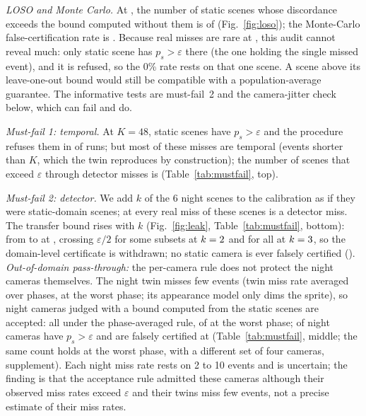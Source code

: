 

\emph{LOSO and Monte Carlo.} At \OPs, the number of static scenes whose discordance exceeds the bound computed
without them is \nLosoOP{} of \nMainScenes{} (Fig.~\ref{fig:loso}); the Monte-Carlo
false-certification rate is \nMcFC. Because real misses are rare at \OPs, this audit cannot reveal much: only
\nScenesPgtEpsOP{} static scene has $p_s>\varepsilon$ there (the one holding the single missed event), and it is refused, so
the 0\% rate rests on that one scene.
A scene above its leave-one-out bound would still be compatible with a population-average guarantee. The informative
tests are must-fail~2 and the camera-jitter check below, which can fail and do.

\emph{Must-fail 1: temporal.} At $K=48$, \nMustFailScenes{} static scenes have $p_s>\varepsilon$ and the procedure refuses
them in \nMustFailRefuse{} of runs; but most of these misses are temporal (events shorter than $K$, which the twin
reproduces by construction); the number of scenes that exceed $\varepsilon$ through detector misses is \nMustFailApp{} 
(Table~\ref{tab:mustfail}, top).

\emph{Must-fail 2: detector.} We add $k$ of the 6 night scenes to the calibration as if they were static-domain scenes;
at \OPs{} every real miss of these scenes is a detector miss. The transfer bound rises with $k$
(Fig.~\ref{fig:leak}, Table~\ref{tab:mustfail}, bottom): from \nLeakUpopZero{} to \nLeakUpopSix{} at \OPs{}, crossing
$\varepsilon/2$ for some subsets at $k=2$ and for all at $k=3$, so the domain-level
certificate is withdrawn; no static camera is ever falsely certified (\nMainFCleak). \emph{Out-of-domain pass-through:}
the per-camera rule does not protect the night cameras themselves. The night twin misses few events (twin miss rate \nPASqNight{} averaged over phases, \nWPSqNight{} at the worst phase;
its appearance model only dims the sprite), so night cameras judged with a bound computed from the static scenes are
accepted: all \nNightScenes{} under the phase-averaged rule, \nOODSNightacc{} of \nOODSNightcams{} at the worst phase;
\nNightFC{} of \nNightScenes{} night cameras have $p_s>\varepsilon$ and are falsely certified at \OPs{}
(Table~\ref{tab:mustfail}, middle; the same count holds at the worst phase, with a different set of four cameras,
supplement). Each night miss rate rests on 2 to 10 events and is uncertain; the
finding is that the acceptance rule admitted these cameras although their observed miss rates exceed $\varepsilon$ and
their twins miss few events, not a precise estimate of their miss rates.

